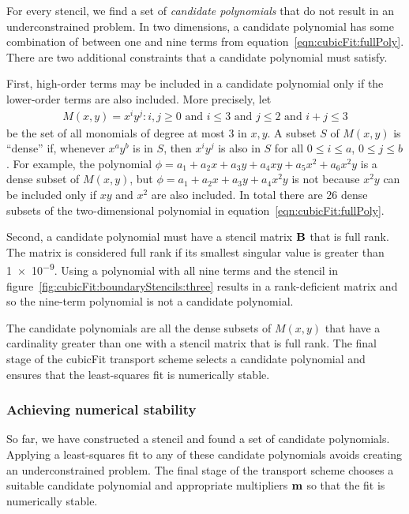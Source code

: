 For every stencil, we find a set of \textit{candidate polynomials} that do not result in an underconstrained problem.
In two dimensions, a candidate polynomial has some combination of between one and nine terms from equation~\eqref{eqn:cubicFit:fullPoly}.  There are two additional constraints that a candidate polynomial must satisfy.

First, high-order terms may be included in a candidate polynomial only if the lower-order terms are also included.
More precisely, let
\begin{align}
	M(x, y) = { x^i y^j : i,j \geq 0 \text{ and } i \leq 3 \text{ and } j \leq 2 \text{ and } i+j \leq 3}
\end{align}
be the set of all monomials of degree at most \num{3} in $x, y$.
A subset $S$ of $M(x,y)$ is ``dense'' if, whenever $x^a y^b$ is in $S$, then $x^i y^j$ is also in $S$ for all $0 \leq i \leq a$, $0 \leq j \leq b$.
For example, the polynomial $\phi = a_1 + a_2 x + a_3 y + a_4 xy + a_5 x^2 + a_6 x^2 y$ is a dense subset of $M(x,y)$, but $\phi = a_1 + a_2 x + a_3 y + a_4 x^2 y$ is not because $x^2 y$ can be included only if $xy$ and $x^2$ are also included.
In total there are 26 dense subsets of the two-dimensional polynomial in equation~\eqref{eqn:cubicFit:fullPoly}.

Second, a candidate polynomial must have a stencil matrix $\mathbf{B}$ that is full rank.  The matrix is considered full rank if its smallest singular value is greater than \num{1e-9}.
Using a polynomial with all nine terms and the stencil in figure~\ref{fig:cubicFit:boundaryStencils:three} results in a rank-deficient matrix and so the nine-term polynomial is not a candidate polynomial.

The candidate polynomials are all the dense subsets of $M(x,y)$ that have a cardinality greater than one with a stencil matrix that is full rank.  The final stage of the cubicFit transport scheme selects a candidate polynomial and ensures that the least-squares fit is numerically stable.

\subsubsection{Achieving numerical stability}
\label{sec:cubicFit:stabilisation}
So far, we have constructed a stencil and found a set of candidate polynomials.  Applying a least-squares fit to any of these candidate polynomials avoids creating an underconstrained problem.  The final stage of the transport scheme chooses a suitable candidate polynomial and appropriate multipliers $\mathbf{m}$ so that the fit is numerically stable.

